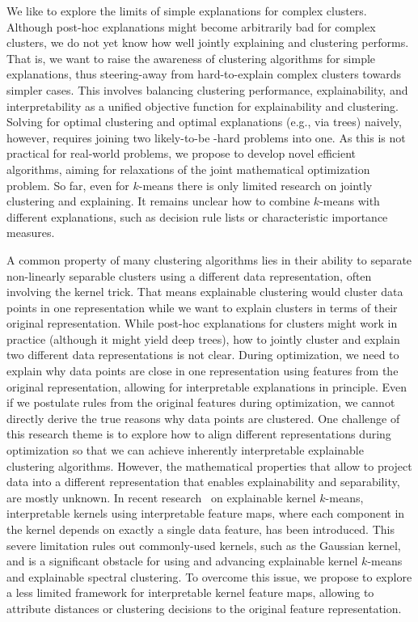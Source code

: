 \documentclass[a4paper,11pt]{article}
\begin{document}
We like to explore the limits of simple explanations for complex clusters.  
Although post-hoc explanations might become arbitrarily bad for complex clusters, we do not yet know how well jointly explaining and clustering performs.
That is, we want to raise the awareness of clustering algorithms for simple explanations, thus steering-away from hard-to-explain complex clusters towards simpler cases.
This involves balancing clustering performance, explainability, and interpretability as a unified objective function for explainability and clustering.
Solving for optimal clustering and optimal explanations (e.g., via trees) naively, however, requires joining two likely-to-be \NP-hard problems into one.
As this is not practical for real-world problems, we propose to develop novel efficient algorithms, aiming for relaxations of the joint mathematical optimization problem.
So far, even for $k$-means there is only limited research on jointly clustering and explaining. 
It remains unclear how to combine $k$-means with different explanations, such as decision rule lists or characteristic importance measures. 

A common property of many clustering algorithms lies in their ability to separate non-linearly separable clusters using a different data representation, often involving the kernel trick.
That means explainable clustering would cluster data points in one representation while we want to explain clusters in terms of their original representation.
While post-hoc explanations for clusters might work in practice (although it might yield deep trees),
how to jointly cluster and explain two different data representations is not clear.
During optimization, we need to explain why data points are close in one representation using features from the original representation, 
allowing for interpretable explanations in principle.
Even if we postulate rules from the original features during optimization, we cannot directly derive the true reasons why data points are clustered.  
One challenge of this research theme is to explore how to align different representations during optimization so that we can achieve inherently interpretable explainable clustering algorithms.
However, the mathematical properties that allow to project data into a different representation that enables explainability and separability, are mostly unknown.
In recent research~\cite{fleissner2024explaining} on explainable kernel $k$-means, interpretable kernels using interpretable feature maps, where each component in the kernel depends on exactly a single data feature, has been introduced.  
This severe limitation rules out commonly-used kernels, such as the Gaussian kernel, and is a significant obstacle for using and advancing explainable kernel $k$-means and explainable spectral clustering.
To overcome this issue, we propose to explore a less limited framework for interpretable kernel feature maps, allowing to attribute distances or clustering decisions to the original feature representation. 
\end{document}
